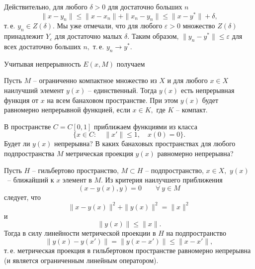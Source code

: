  Действительно, для любого $\delta>0$ для достаточно
 больших $n$
 $$
 \|x-y_n\|\le \|x-x_n\|+\|x_n-y_n\|\le \|x-y^*\|+\delta,
 $$
 т.\,е. $y_n\in Z(\delta).$ Мы уже отмечали, что для любого
 $\varepsilon>0$ множество $Z(\delta)$ принадлежит $Y_{\varepsilon}$ для
 достаточно малых $\delta.$ Таким образом, $\|y_n-y^*\|\le \varepsilon$
 для всех достаточно больших $n,$ т.\,е. $y_n\to y^*.$

 Учитывая непрерывность $E(x,M)$ {получаем}
 \begin{Corollary}
 Пусть $M$ -- ограниченно компактное множество из $X$
 и для любого $x\in X$ наилучший элемент $y(x)$ -- единственный.
 Тогда $y(x)$ {есть} непрерывная функция от $x$
 на всем банаховом пространстве. {При этом} $y(x)$ будет равномерно непрерывной
 функцией, если $x\in K,$ где $K$ -- компакт.
 \end{Corollary}

 \task %
 В пространстве $C{=C[0,1]}$ приближаем функциями из класса
 $$
 \{ x\in C:\quad \|x'\|\le 1,\quad x(0)=0\}.
 $$
 Будет ли $y(x)$ непрерывна? В каких банаховых пространствах для
 любого подпространства {$M$ метрическая проекция $y(x)$}
 равномерно непрерывна?

 Пусть $H$ -- гильбертово пространство, $M\subset H $ -- подпространство,
 $  x\in X,$ $y(x)$~{-- ближайший к $x$ элемент в $M.$}
 Из критерия наилучшего приближения
 $$
 (x-y(x),y)=0\qquad \forall\  y\in M
 $$
 следует, что
 $$
 \|x-y(x)\|^{2}+\|y(x)\|^2=\|x\|^2
 $$
 и
 $$
 \|y(x)\|\le \|x\|.
 $$
 Тогда {в силу линейности метрической проекции в $H$ на подпространство}
 $$
 \|y(x)-y(x')\|=\|y(x-x')\|\le \|x-x'\|,
 $$
 т.\,е. метрическая проекция в гильбертовом
 пространстве равномерно непрерывна (и является
 ограниченным линейным оператором).

